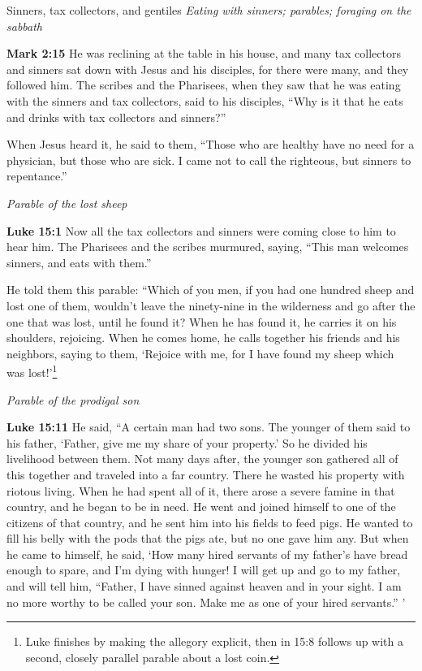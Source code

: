 \documentclass[10pt,twoside]{article} %
\newcommand{\quotesize}{\normalsize{}}
\newenvironment{quotetext}{\begingroup\quotesize}{\endgroup}
\newcommand{\bible}[2]{\begin{quotetext}\textbf{#1} #2\end{quotetext}}
\newcommand{\gospelmark}[2]{\bible{Mark #1}{#2}}
\newcommand{\luke}[2]{\bible{Luke #1}{#2}}
\newcommand{\subhead}[1]{\emph{#1}\par}
\begin{document}
\begin{section}{Sinners, tax collectors, and gentiles}
\subhead{Eating with sinners; parables; foraging on the sabbath}

\gospelmark{2:15}{  He was reclining at the table in his house, and many tax collectors and sinners sat down with Jesus and his disciples, for there were many, and they followed him.   The scribes and the Pharisees, when they saw that he was eating with the sinners and tax collectors, said to his disciples, ``Why is it that he eats and drinks with tax collectors and sinners?''

  When Jesus heard it, he said to them, ``Those who are healthy have no need for a physician, but those who are sick. I came not to call the righteous, but sinners to repentance.''}

\subhead{Parable of the lost sheep}

\luke{15:1}{Now all the tax collectors and sinners were coming close to him to hear him.   The Pharisees and the scribes murmured, saying, ``This man welcomes sinners, and eats with them.''

  He told them this parable:    ``Which of you men, if you had one hundred sheep and lost one of them, wouldn't leave the ninety-nine in the wilderness and go after the one that was lost, until he found it?    When he has found it, he carries it on his shoulders, rejoicing.    When he comes home, he calls together his friends and his neighbors, saying to them, `Rejoice with me, for I have found my sheep which was lost!'\footnote{Luke
finishes by making the allegory explicit, then in 15:8 follows up
with a second, closely parallel parable about a lost coin.}
}

\subhead{Parable of the prodigal son}

\luke{15:11}{
  He said, ``A certain man had two sons.    The younger of them said to his father, `Father, give me my share of your property.' So he divided his livelihood between them.    Not many days after, the younger son gathered all of this together and traveled into a far country. There he wasted his property with riotous living.    When he had spent all of it, there arose a severe famine in that country, and he began to be in need.    He went and joined himself to one of the citizens of that country, and he sent him into his fields to feed pigs.    He wanted to fill his belly with the pods that the pigs ate, but no one gave him any.    But when he came to himself, he said, `How many hired servants of my father's have bread enough to spare, and I'm dying with hunger!    I will get up and go to my father, and will tell him, ``Father, I have sinned against heaven and in your sight.    I am no more worthy to be called your son. Make me as one of your hired servants.'' '

}
\end{section}
\end{document}

